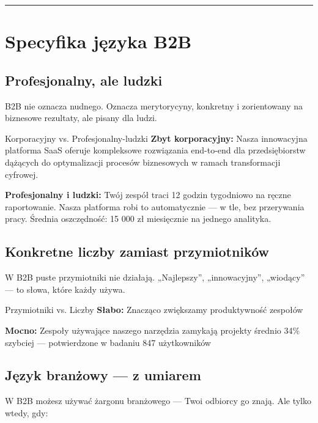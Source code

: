 \documentclass[
  12pt,
  a4paper,
  twoside,
  openright,
  12pt,
  DIV=12,
  BCOR=12mm]{scrbook}
\newcommand{\decoline}{%
  \begin{center}
    \textcolor{bordergray}{\rule{0.3\textwidth}{0.5pt}}
  \end{center}
}
\begin{document}
\decoline

\section{Specyfika języka B2B}\label{specyfika-jux119zyka-b2b}

\subsection{Profesjonalny, ale ludzki}\label{profesjonalny-ale-ludzki}

B2B nie oznacza nudnego. Oznacza merytorycyny, konkretny i zorientowany
na biznesowe rezultaty, ale pisany dla ludzi.

\begin{przyklad}{Korporacyjny vs. Profesjonalny-ludzki}
\textbf{Zbyt korporacyjny:}
Nasza innowacyjna platforma SaaS oferuje kompleksowe rozwiązania end-to-end dla przedsiębiorstw dążących do optymalizacji procesów biznesowych w ramach transformacji cyfrowej.

\textbf{Profesjonalny i ludzki:}
Twój zespół traci 12 godzin tygodniowo na ręczne raportowanie. Nasza platforma robi to automatycznie --- w tle, bez przerywania pracy. Średnia oszczędność: 15 000 zł miesięcznie na jednego analityka.
\end{przyklad}

\subsection{Konkretne liczby zamiast
przymiotników}\label{konkretne-liczby-zamiast-przymiotnikuxf3w}

W B2B puste przymiotniki nie działają. „Najlepszy'', „innowacyjny'',
„wiodący'' --- to słowa, które każdy używa.

\begin{przyklad}{Przymiotniki vs. Liczby}
\textbf{Słabo:}
Znacząco zwiększamy produktywność zespołów

\textbf{Mocno:}
Zespoły używające naszego narzędzia zamykają projekty średnio 34\% szybciej --- potwierdzone w badaniu 847 użytkowników
\end{przyklad}

\subsection{Język branżowy --- z
umiarem}\label{jux119zyk-branux17cowy-z-umiarem}

W B2B możesz używać żargonu branżowego --- Twoi odbiorcy go znają. Ale
tylko wtedy, gdy:
\end{document}

